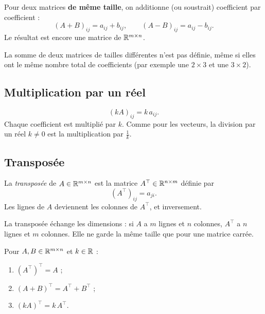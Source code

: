 \begin{definition}
Pour deux matrices \textbf{de même taille}, on
additionne (ou soustrait) coefficient par
coefficient :
\[
    (A + B)_{ij} = a_{ij} + b_{ij},
    \qquad
    (A - B)_{ij} = a_{ij} - b_{ij}.
\]
Le résultat est encore une matrice de
$\mathbb{R}^{m \times n}$.
\end{definition}

\begin{importantbox}
La somme de deux matrices de tailles différentes
n'est pas définie, même si elles ont le même nombre
total de coefficients (par exemple une $2 \times 3$
et une $3 \times 2$).
\end{importantbox}

\subsection{Multiplication par un réel}

\begin{definition}
\[
    (kA)_{ij} = k\, a_{ij}.
\]
Chaque coefficient est multiplié par $k$. Comme pour
les vecteurs, la division par un réel $k \neq 0$ est
la multiplication par $\frac{1}{k}$.
\end{definition}

\subsection{Transposée}

\begin{definition}[Transposée]
La \emph{transposée} de $A \in \mathbb{R}^{m \times n}$ est
la matrice $A^\top \in \mathbb{R}^{n \times m}$ définie par
\[
    (A^\top)_{ij} = a_{ji}.
\]
Les lignes de $A$ deviennent les colonnes de
$A^\top$, et inversement.
\end{definition}

\begin{importantbox}
La transposée échange les dimensions : si $A$ a
$m$ lignes et $n$ colonnes, $A^\top$ a $n$ lignes et
$m$ colonnes. Elle ne garde la même taille que pour
une matrice carrée.
\end{importantbox}

\begin{proposition}
Pour $A, B \in \mathbb{R}^{m \times n}$ et $k \in \mathbb{R}$ :
\begin{enumerate}
    \item $(A^\top)^\top = A$ ;
    \item $(A + B)^\top = A^\top + B^\top$ ;
    \item $(kA)^\top = k\, A^\top$.
\end{enumerate}
\end{proposition}

